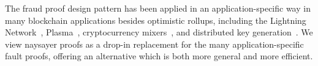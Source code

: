 The fraud proof design pattern has been applied in an application-specific way in many blockchain applications besides optimistic rollups, including the Lightning Network~\cite{PooDry16}, Plasma~\cite{PooBut17}, cryptocurrency mixers~\cite{EPRINT:SNBB19}, and distributed key generation~\cite{EPRINT:SJSW19}. We view naysayer proofs as a drop-in replacement for the many application-specific fault proofs, offering an alternative which is both more general and more efficient.

